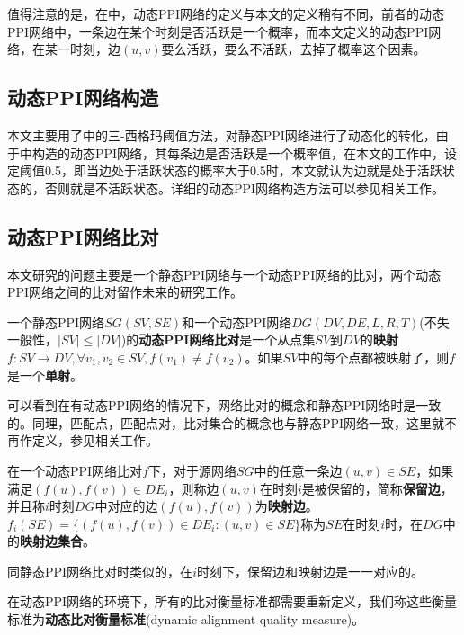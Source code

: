 值得注意的是，在\cite{zhang2016method}中，动态PPI网络的定义与本文的定义稍有不同，前者的动态PPI网络中，一条边在某个时刻是否活跃是一个概率，而本文定义的动态PPI网络，在某一时刻，边$(u,v)$要么活跃，要么不活跃，去掉了概率这个因素。

\subsection{动态PPI网络构造}
本文主要用了\cite{zhang2016method}中的三-西格玛阈值方法，对静态PPI网络进行了动态化的转化，由于\cite{zhang2016method}中构造的动态PPI网络，其每条边是否活跃是一个概率值，在本文的工作中，设定阈值0.5，即当边处于活跃状态的概率大于$0.5$时，本文就认为边就是处于活跃状态的，否则就是不活跃状态。详细的动态PPI网络构造方法可以参见相关工作。

\subsection{动态PPI网络比对}
本文研究的问题主要是一个静态PPI网络与一个动态PPI网络的比对，两个动态PPI网络之间的比对留作未来的研究工作。

\begin{defn}[动态PPI网络比对]
\label{defndppigna}
一个静态PPI网络$SG(SV,SE)$和一个动态PPI网络$DG(DV,DE,L,R,T)$(不失一般性，$|SV|\leq |DV|$)的\textbf{动态PPI网络比对}是一个从点集$SV$到$DV$的\textbf{映射}$f:SV\rightarrow DV,\forall v_1,v_2\in SV,f(v_1)\neq f(v_2)$。如果$SV$中的每个点都被映射了，则$f$是一个\textbf{单射}。
\end{defn}

可以看到在有动态PPI网络的情况下，网络比对的概念和静态PPI网络时是一致的。同理，匹配点，匹配点对，比对集合的概念也与静态PPI网络一致，这里就不再作定义，参见相关工作。

\begin{defn}
\label{defncedge}
在一个动态PPI网络比对$f$下，对于源网络$SG$中的任意一条边$(u,v)\in SE$，如果满足$(f(u),f(v))\in DE_i$，则称边$(u,v)$在时刻$i$是被保留的，简称\textbf{保留边}，并且称$i$时刻$DG$中对应的边$(f(u),f(v))$为\textbf{映射边}。$f_i(SE)=\{(f(u),f(v))\in DE_i:(u,v)\in SE\}$称为$SE$在时刻$i$时，在$DG$中的\textbf{映射边集合}。
\end{defn}

同静态PPI网络比对时类似的，在$i$时刻下，保留边和映射边是一一对应的。

在动态PPI网络的环境下，所有的比对衡量标准都需要重新定义，我们称这些衡量标准为\textbf{动态比对衡量标准}(dynamic alignment quality measure)。

